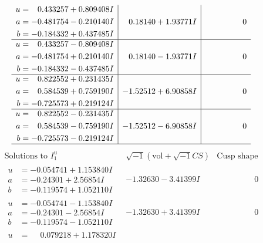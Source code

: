 \documentclass[1p]{elsarticle_modified}
\theoremstyle{definition}
\newcommand{\I}{\sqrt{-1}}
\begin{document}
$$\begin{array}{c|c|c}
\begin{aligned}
u &= \phantom{-}0.433257 + 0.809408 I \\
a &= -0.481754 - 0.210140 I \\
b &= -0.184332 + 0.437485 I\end{aligned}
 & \phantom{-}0.18140 + 1.93771 I & \phantom{-0.000000 } 0 \\ \hline\begin{aligned}
u &= \phantom{-}0.433257 - 0.809408 I \\
a &= -0.481754 + 0.210140 I \\
b &= -0.184332 - 0.437485 I\end{aligned}
 & \phantom{-}0.18140 - 1.93771 I & \phantom{-0.000000 } 0 \\ \hline\begin{aligned}
u &= \phantom{-}0.822552 + 0.231435 I \\
a &= \phantom{-}0.584539 + 0.759190 I \\
b &= -0.725573 + 0.219124 I\end{aligned}
 & -1.52512 + 6.90858 I & \phantom{-0.000000 } 0 \\ \hline\begin{aligned}
u &= \phantom{-}0.822552 - 0.231435 I \\
a &= \phantom{-}0.584539 - 0.759190 I \\
b &= -0.725573 - 0.219124 I\end{aligned}
 & -1.52512 - 6.90858 I & \phantom{-0.000000 } 0\\
 \hline 
 \end{array}$$\newpage$$\begin{array}{c|c|c}  
\text{Solutions to }I^u_{1}& \I (\text{vol} + \sqrt{-1}CS) & \text{Cusp shape}\\
 \hline 
\begin{aligned}
u &= -0.054741 + 1.153840 I \\
a &= -0.24301 + 2.56854 I \\
b &= -0.119574 + 1.052110 I\end{aligned}
 & -1.32630 - 3.41399 I & \phantom{-0.000000 } 0 \\ \hline\begin{aligned}
u &= -0.054741 - 1.153840 I \\
a &= -0.24301 - 2.56854 I \\
b &= -0.119574 - 1.052110 I\end{aligned}
 & -1.32630 + 3.41399 I & \phantom{-0.000000 } 0 \\ \hline\begin{aligned}
u &= \phantom{-}0.079218 + 1.178320 I \\

\end{aligned}
\end{array}$$
\end{document}
